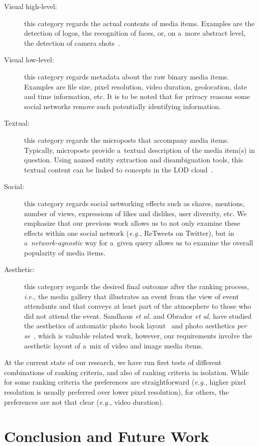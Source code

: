 \documentclass[runningheads,a4paper,11pt]{llncs}
\begin{document}
\begin{description}
\item[Visual high-level:]
this category regards the actual contents of media items.
Examples are the detection of logos, the recognition of faces, or, on a~more abstract level,
the detection of camera shots~\cite{Crowdsourcing2011}.

\item[Visual low-level:]
this category regards metadata about the raw binary media items.
Examples are file size, pixel resolution, video duration, geolocation,
date and time information, etc.
It is to be noted that for privacy reasons some social networks
remove such potentially identifying information.

\item[Textual:]
this category regards the microposts that accompany media items.
Typically, microposts provide a~textual description of the media item(s) in question.
Using named entity extraction and disambiguation tools,
this textual content can be linked to concepts in the LOD cloud~\cite{Facebook2011}.

\item[Social:]
this category regards social networking effects such as shares, mentions,
number of views, expressions of likes and dislikes, user diversity, etc.
We emphasize that our previous work allows us
to not only examine these effects within one social network (\emph{e.g.}, ReTweets on Twitter),
but in a~\emph{network-agnostic} way for a~given query allows us
to examine the overall popularity of media items.

\item[Aesthetic:]
this category regards the desired final outcome after the ranking process, \emph{i.e.},
the media gallery that illustrates an event from the view of event attendants and
that conveys at least part of the atmosphere to those who did not attend the event.
Sandhaus \emph{et al.} and Obrador \emph{et al.} have studied the aesthetics of
automatic photo book layout~\cite{Photo2011}
and photo aesthetics \emph{per se}~\cite{Photo2012}, which is valuable related work, however,
our requirements involve the aesthetic layout of a~mix of video and image media items.
\end{description}

\noindent At the current state of our research, we have run first tests of different combinations
of ranking criteria, and also of ranking criteria in isolation.
While for some ranking criteria the preferences are straightforward
(\emph{e.g.}, higher pixel resolution is usually preferred over lower pixel resolution),
for others, the preferences are not that clear (\emph{e.g.}, video duration).


\section{Conclusion and Future Work}

\renewcommand{\ttdefault}{cmvtt}
\renewcommand\UrlFont\tt



\end{document}
